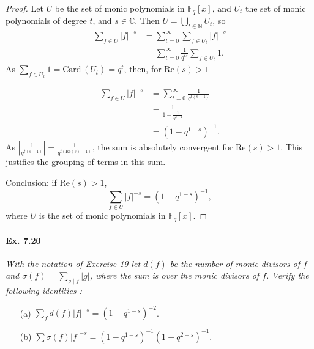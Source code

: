 \documentclass[11pt,a4paper]{article}
\newcommand{\N}{\mathbb{N}}
\newcommand{\C}{\mathbb{C}}
\begin{document}
\begin{proof}
Let $U$ be the set of monic polynomials in $\mathbb{F}_q[x]$, and $U_t$ the set of monic polynomials of degree $t$, and $s\in \C$. Then $U = \bigcup_{t \in \N} U_t$, so
\begin{align*}
\sum_{f \in U} \vert f \vert^{-s }&= \sum_{t=0}^\infty \sum_{f \in U_t} \vert f \vert^{-s}\\
&=\sum_{t=0}^\infty \frac{1}{q^{ts}} \sum_{f\in U_t} 1.
\end{align*}
As $\sum_{f\in U_t} 1 = \mathrm{Card} \, (U_t) = q^t$, then, for $\mathrm{Re}(s) >1$

\begin{align*}
\sum_{f \in U} \vert f \vert^{-s } &= \sum_{t=0}^\infty \frac{1}{q^{t(s-1)}}\\
&=\frac{1}{1-\frac{1}{q^{s-1}}}\\
&= (1-q^{1-s})^{-1}.
\end{align*}
As $\left | \frac{1}{q^{t(s-1)}} \right | = \frac{1}{q^{t(\mathrm{Re}(s)-1)}}$, the sum is absolutely convergent for $\mathrm{Re}(s)>1$. This justifies the grouping of terms in this sum.

\bigskip

Conclusion:  if $\mathrm{Re}(s)>1$, 
$$\sum_{f \in U} \vert f \vert^{-s } =(1-q^{1-s})^{-1},$$
where $U$ is the set of monic polynomials in  $\mathbb{F}_q[x]$.
\end{proof}

\paragraph{Ex. 7.20}

{\it With the notation of Exercise 19 let $d(f)$ be the number of monic divisors of $f$ and $\sigma(f) = \sum_{g\mid f} |g|$, where the sum is over the monic divisors of $f$. Verify the following identities :
\begin{enumerate}
\item[(a)] $\sum_f d(f) |f|^{-s} = (1 -q^{1-s})^{-2}$.
\item[(b)] $\sum \sigma(f)|f|^{-s} = (1-q^{1-s})^{-1} (1-q^{2-s})^{-1}$.
\end{enumerate}

}
\end{document}
